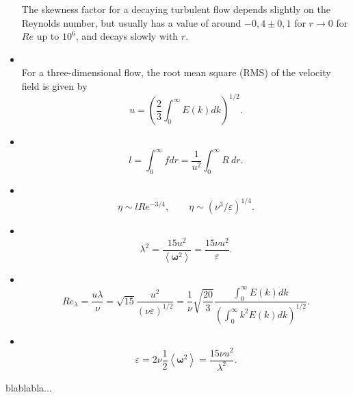 \begin{itemize}
The skewness factor for a decaying turbulent flow depends slightly on the Reynolds number, but usually has a value of around $-0,4\pm0,1$ for $r\rightarrow0$ for $Re$ up to $10^6$, and decays slowly with $r$.
\item{}\\ For a three-dimensional flow, the root mean square (RMS) of the velocity field is given by
$$u=\left(\frac{2}{3}\int_0^\infty E(k)dk\right)^{1/2}.$$
\item{}\\ $$l=\int_0^\infty fdr=\frac{1}{u^2}\int_0^\infty R\ dr.$$
\item{}\\$$\eta\sim lRe^{-3/4},\quad\quad\eta\sim\left(\nu^3/\varepsilon\right)^{1/4}.$$
\item{}\\$$\lambda^2=\frac{15u^2}{\left\langle\boldsymbol{\omega}^2\right\rangle}=\frac{15\nu u^2}{\varepsilon}.$$
\item{}\\$$Re_\lambda=\frac{u\lambda}{\nu}=\sqrt{15}\frac{u^2}{\left(\nu\varepsilon\right)^{1/2}}=\frac{1}{\nu}\sqrt{\frac{20}{3}}\frac{\int_0^\infty E(k)dk}{\left(\int_0^\infty k^2E(k)dk\right)^{1/2}}.$$
\item{}\\$$\varepsilon=2\nu\frac{1}{2}\left\langle\boldsymbol{\omega}^2\right\rangle=\frac{15\nu u^2}{\lambda^2}.$$
\end{itemize}

blablabla...
